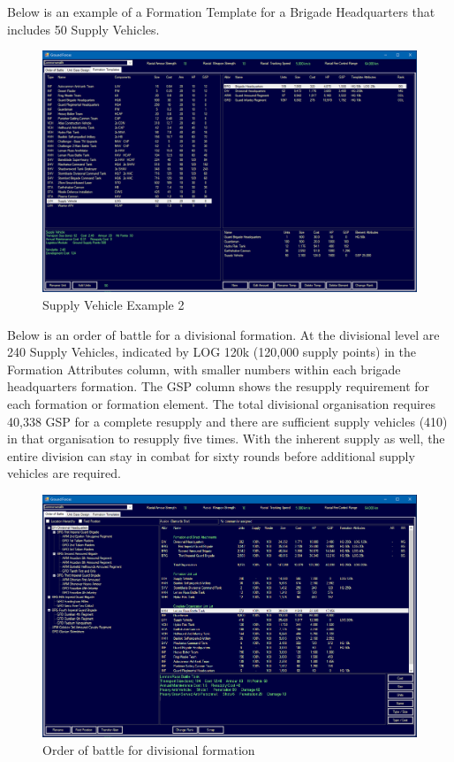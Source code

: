 \documentclass[../../Aurora C# unofficial manual.tex]{subfiles}
\begin{document}
	Below is an example of a Formation Template for a Brigade Headquarters that includes 50 Supply Vehicles.
	\begin{figure}[H]
		\centering
		\includegraphics[width=0.95\linewidth]{images/SupplyVehicle2}
		\caption[Supply Vehicle]{Supply Vehicle Example 2}
		\label{fig:supplyvehicle2}
	\end{figure}

	Below is an order of battle for a divisional formation. At the divisional level are 240 Supply Vehicles, indicated by LOG 120k (120,000 supply points) in the Formation Attributes column, with smaller numbers within each brigade headquarters formation. The GSP column shows the resupply requirement for each formation or formation element. The total divisional organisation requires 40,338 GSP for a complete resupply and there are sufficient supply vehicles (410) in that organisation to resupply five times. With the inherent supply as well, the entire division can stay in combat for sixty rounds before additional supply vehicles are required.
	\begin{figure}[H]
		\centering
		\includegraphics[width=0.95\linewidth]{images/SupplyVehicle3}
		\caption[Supply Vehicle]{Order of battle for divisional formation}
		\label{fig:supplyvehicle3}
	\end{figure}
\end{document}
